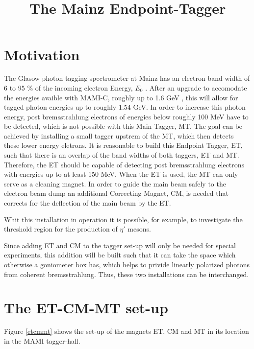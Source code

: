 \documentclass[11pt]{book}
\begin{document}
\parindent=0cm 

\title {The Mainz Endpoint-Tagger}

\section{Motivation}

The Glasow photon tagging spectrometer at Mainz has
an electron band width of 6 to 95 \% of the incoming electron
Energy, $E_0$ \cite{glatag}. After an upgrade \cite{taggup} to accomodate the
energies avaible with MAMI-C, roughly up to 1.6 GeV \cite{mamic}, this will
allow for tagged photon energies up to roughly 1.54 GeV. In order to
increase this photon energy, post bremsstrahlung electrons of energies
below roughly 100 MeV have to be detected, which is not possible with this
Main Tagger, MT. The goal can be achieved by installing a small tagger
upstrem of the MT, which then detects these lower energy eletrons. It is
reasonable to build this Endpoint Tagger, ET, such that there is an overlap
of the band widths of both taggers, ET and MT. Therefore, the ET should be
capable of detecting post bremsstrahlung electrons with energies up to
at least 150 MeV. When the ET is used, the MT
can only serve as a cleaning magnet. In order to guide the main beam safely to
the electron beam dump an additional Correcting Magnet, CM, is needed that
corrects for the deflection of the main beam by the ET.

Whit this installation in operation it is possible, for example,
to investigate the threshold region for the production of $\eta'$ mesons.

Since adding ET and CM to the tagger set-up will only be needed for special
experiments, this addition will be built such that it can take the space
which otherwise a goniometer box has, which helps to privide linearly
polarized photons from coherent bremsstrahlung. Thus, these two installations
can be interchanged.


\section{The ET-CM-MT set-up}

Figure \ref{etcmmt} shows the set-up of the magnets ET, CM and MT
in its location in the MAMI tagger-hall.\\
\end{document}
